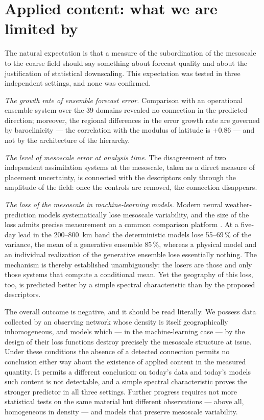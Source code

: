 \documentclass[11pt,a4paper]{article}
\begin{document}
\section{Applied content: what we are limited by}
\label{sec:applied}

The natural expectation is that a measure of the subordination of the mesoscale to the coarse field should say something about forecast quality and about the justification of statistical downscaling. This expectation was tested in three independent settings, and none was confirmed.

\emph{The growth rate of ensemble forecast error.} Comparison with an operational ensemble system over the 39 domains revealed no connection in the predicted direction; moreover, the regional differences in the error growth rate are governed by baroclinicity --- the correlation with the modulus of latitude is $+0.86$ --- and not by the architecture of the hierarchy.

\emph{The level of mesoscale error at analysis time.} The disagreement of two independent assimilation systems at the mesoscale, taken as a direct measure of placement uncertainty, is connected with the descriptors only through the amplitude of the field: once the controls are removed, the connection disappears.

\emph{The loss of the mesoscale in machine-learning models.} Modern neural weather-prediction models \cite{Lam2023,Bi2023,Price2025} systematically lose mesoscale variability, and the size of the loss admits precise measurement on a common comparison platform \cite{Rasp2024}. At a five-day lead in the 200--800~km band the deterministic models lose 55--69\,\% of the variance, the mean of a generative ensemble 85\,\%, whereas a physical model and an individual realization of the generative ensemble lose essentially nothing. The mechanism is thereby established unambiguously: the losers are those and only those systems that compute a conditional mean. Yet the geography of this loss, too, is predicted better by a simple spectral characteristic than by the proposed descriptors.

The overall outcome is negative, and it should be read literally. We possess data collected by an observing network whose density is itself geographically inhomogeneous, and models which --- in the machine-learning case --- by the design of their loss functions destroy precisely the mesoscale structure at issue. Under these conditions the absence of a detected connection permits no conclusion either way about the existence of applied content in the measured quantity. It permits a different conclusion: on today's data and today's models such content is not detectable, and a simple spectral characteristic proves the stronger predictor in all three settings. Further progress requires not more statistical tests on the same material but different observations --- above all, homogeneous in density --- and models that preserve mesoscale variability.
\end{document}
